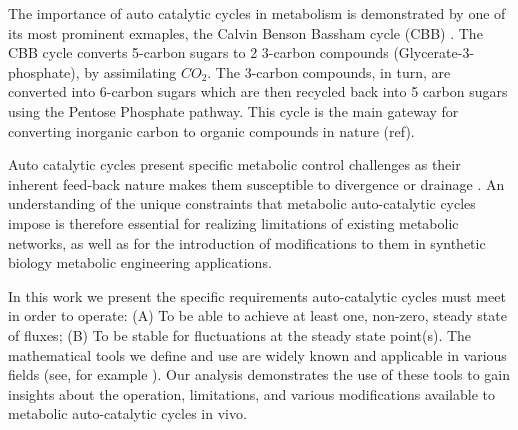 \documentclass[a4page,notitlepage]{article}
\begin{document}
    The importance of auto catalytic cycles in metabolism is demonstrated by one of its most prominent exmaples, the Calvin Benson Bassham cycle (CBB) \cite{Benson1950-cl}.
    The CBB cycle converts 5-carbon sugars to 2 3-carbon compounds (Glycerate-3-phosphate), by assimilating $CO_2$.
    The 3-carbon compounds, in turn, are converted into 6-carbon sugars which are then recycled back into 5 carbon sugars using the Pentose Phosphate pathway.
    This cycle is the main gateway for converting inorganic carbon to organic compounds in nature (ref).

    Auto catalytic cycles present specific metabolic control challenges as their inherent feed-back nature makes them susceptible to divergence or drainage \cite{Reznik2010-te}.
    An understanding of the unique constraints that metabolic auto-catalytic cycles impose is therefore essential for realizing limitations of existing metabolic networks, as well as for the introduction of modifications to them in synthetic biology metabolic engineering applications.

    In this work we present the specific requirements auto-catalytic cycles must meet in order to operate: (A) To be able to achieve at least one, non-zero, steady state of fluxes; 
    (B) To be stable for fluctuations at the steady state point(s).
    The mathematical tools we define and use are widely known and applicable in various fields (see, for example \cite{Strogatz2014-hp}).
    Our analysis demonstrates the use of these tools to gain insights about the operation, limitations, and various modifications available to metabolic auto-catalytic cycles in vivo.
\end{document}

